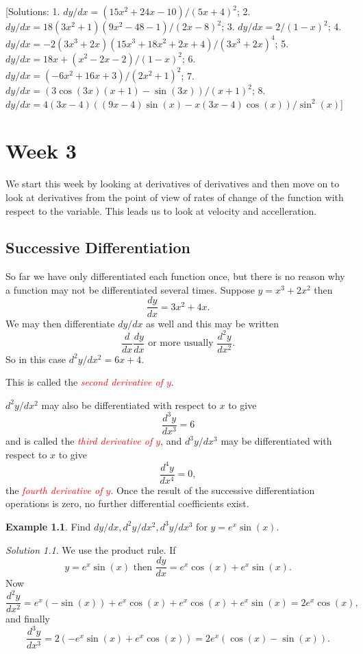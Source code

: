 \documentclass[
  11pt,
  oneside]{book}
\newcommand{\slide}{}
\theoremstyle{definition}
\theoremstyle{definition}
\newtheorem{example}{Example}[chapter]
\theoremstyle{definition}
\theoremstyle{definition}
\theoremstyle{remark}
\newtheorem*{solution}{Solution}
\begin{document}
\slide

{[}Solutions: 1. \(dy/dx = (15x^2+24x-10)/(5x+4)^2\); 2. \(dy/dx = 18(3x^2+1)(9x^2-48-1)/(2x-8)^2\); 3. \(dy/dx = 2/(1-x)^2\); 4. \(dy/dx = -2(3x^3+2x)(15x^3+18x^2+2x+4)/(3x^3+2x)^4\); 5. \(dy/dx = 18x+(x^2-2x-2)/(1-x)^2\); 6. \(dy/dx = (-6x^2+16x+3)/(2x^2+1)^2\); 7. \(dy/dx = (3\cos(3x)(x+1)-\sin(3x))/(x+1)^2\); 8. \(dy/dx = 4(3x-4)((9x-4)\sin(x)-x(3x-4)\cos(x))/\sin^2(x)\){]}

\chapter{Week 3}\label{week-3}

We start this week by looking at derivatives of derivatives and then move on to look at derivatives from the point of view of rates of change of the function with respect to the variable. This leads us to look at velocity and accelleration.
\slide

\section{Successive Differentiation}\label{lecture-seven}

So far we have only differentiated each function once, but there is no reason why a function may not be differentiated several times.
Suppose \(y = x^3 + 2x^2\) then
\[
\frac{dy}{dx} = 3x^2 + 4x.
\]
We may then differentiate \(dy/dx\) as well and this may be written
\[
\frac{d}{dx}\frac{dy}{dx}\text{ or more usually }\frac{d^2y}{dx^2}.
\]
So in this case \(d^2y/dx^2 = 6x+4\).

This is called the \textcolor{red}{\em second derivative of $y$}.
\slide

\(d^2y/dx^2\) may also be differentiated with respect to \(x\) to give
\[
\frac{d^3y}{dx^3} = 6
\]
and is called the \textcolor{red}{\em third derivative of $y$}, and \(d^3y/dx^3\) may be differentiated with respect to \(x\) to give
\[
\frac{d^4y}{dx^4} = 0,
\]
the \textcolor{red}{\em fourth derivative of $y$}. Once the result of the successive differentiation operations is zero, no further differential coefficients exist.
\slide

\begin{example}
Find \(dy/dx, d^2y/dx^2, d^3y/dx^3\) for \(y =e^x\sin(x)\).
\end{example}

\begin{solution}
We use the product rule. If
\[
y=e^x\sin(x)\text{ then }\frac{dy}{dx} = e^x\cos(x) + e^x\sin(x).
\]
Now
\[
\frac{d^2y}{dx^2} = e^x(-\sin(x)) + e^x\cos(x) + e^x\cos(x)+e^x\sin(x) = 2e^x\cos(x),
\]
and finally
\[
\frac{d^3y}{dx^3} = 2(-e^x\sin(x)+e^x\cos(x)) = 2e^x(\cos(x)-\sin(x)).
\]
\end{solution}
\end{document}
